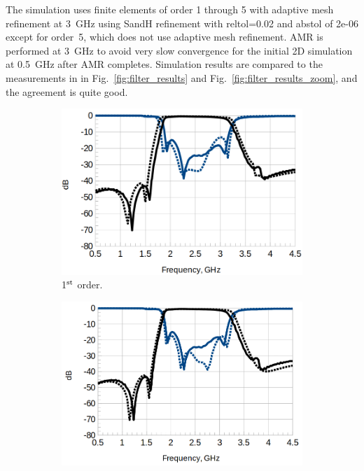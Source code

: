 \documentclass[titlepage]{article}
\renewcommand\_{\textunderscore\linebreak[1]}
\begin{document}
The simulation uses finite elements of order 1 through 5 with adaptive mesh refinement at 3~GHz using SandH refinement with reltol=0.02 and abstol of 2e-06 except for order~5, which does not use adaptive mesh refinement.  AMR is performed at 3~GHz to avoid very slow convergence for the initial 2D simulation at 0.5~GHz after AMR completes.  Simulation results are compared to the measurements in \cite{Weng} in Fig.~\ref{fig:filter_results} and Fig.~\ref{fig:filter_results_zoom}, and the agreement is quite good. 
\begin{figure}[p]
  \centering
  \begin{subfigure}{0.45\textwidth}
     \includegraphics[width=\linewidth]{../regression/OpenParEM3D/microstrip/filter_study/screenshots/microstrip_filter_1st_order.png}
     \caption{1$^{\textnormal{st}}$ order.}
  \end{subfigure}
  \begin{subfigure}{0.45\textwidth}
     \includegraphics[width=\linewidth]{../regression/OpenParEM3D/microstrip/filter_study/screenshots/microstrip_filter_2nd_order.png}

\end{subfigure}
\end{figure}
\end{document}
